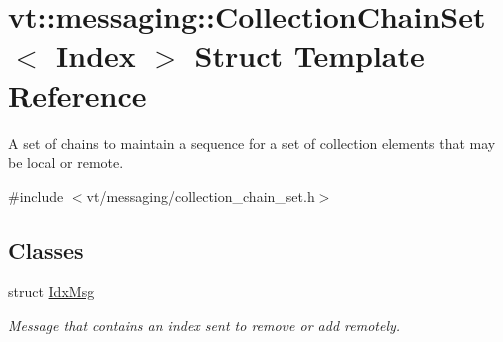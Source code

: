 \hypertarget{classvt_1_1messaging_1_1_collection_chain_set}{}\section{vt\+:\+:messaging\+:\+:Collection\+Chain\+Set$<$ Index $>$ Struct Template Reference}
\label{classvt_1_1messaging_1_1_collection_chain_set}


A set of chains to maintain a sequence for a set of collection elements that may be local or remote.  




{\ttfamily \#include $<$vt/messaging/collection\+\_\+chain\+\_\+set.\+h$>$}

\subsection*{Classes}
\begin{DoxyCompactItemize}
\item 
struct \hyperlink{structvt_1_1messaging_1_1_collection_chain_set_1_1_idx_msg}{Idx\+Msg}
\begin{DoxyCompactList}\small\item\em Message that contains an index sent to remove or add remotely. \end{DoxyCompactList}\end{DoxyCompactItemize}
